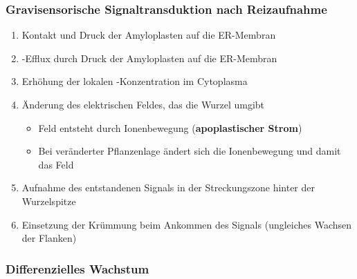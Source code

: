 \documentclass[aspectratio=169
]{beamer}
\begin{document}
\begin{frame}[<+(1)->]
\frametitle{Gravisensorische Signaltransduktion nach Reizaufnahme}

\begin{enumerate}
	\item Kontakt und Druck der Amyloplasten auf die ER-Membran
	\item {}-Efflux durch Druck der Amyloplasten auf die ER-Membran 
	\item Erhöhung der lokalen -Konzentration im Cytoplasma
	\item Änderung des elektrischen Feldes, das die Wurzel umgibt
	\begin{itemize}
		\item Feld entsteht durch Ionenbewegung (\textbf{apoplastischer Strom})
		\item Bei veränderter Pflanzenlage ändert sich die Ionenbewegung und damit das Feld
	\end{itemize}
	\item Aufnahme des entstandenen Signals in der Streckungszone hinter der Wurzelspitze
	\item Einsetzung der Krümmung beim Ankommen des Signals (ungleiches Wachsen der Flanken)
\end{enumerate}
\end{frame}
			
\subsubsection{Differenzielles Wachstum}
\end{document}
